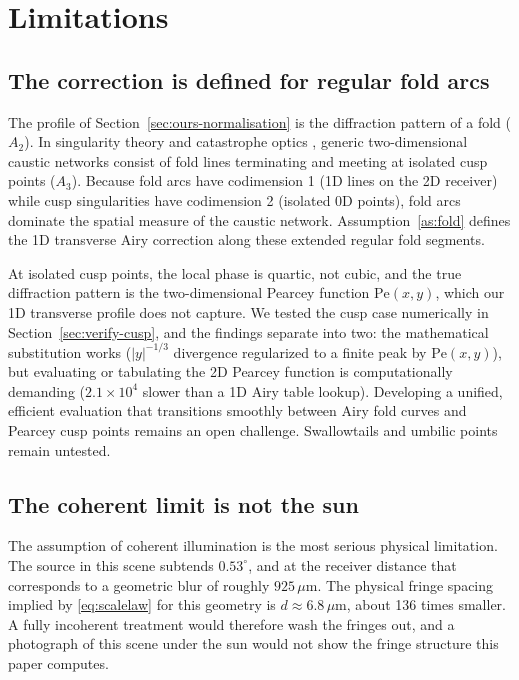 \section{Limitations}
\label{sec:limitations}

\subsection{The correction is defined for regular fold arcs}
\label{sec:limits-fold}

The profile of Section~\ref{sec:ours-normalisation} is the diffraction pattern
of a fold ($A_2$). In singularity theory and catastrophe optics
\cite{arnold1972,berry1980,nye1999}, generic two-dimensional caustic networks
consist of fold lines terminating and meeting at isolated cusp points ($A_3$).
Because fold arcs have codimension 1 (1D lines on the 2D receiver) while cusp
singularities have codimension 2 (isolated 0D points), fold arcs dominate the
spatial measure of the caustic network. Assumption~\ref{as:fold} defines the
1D transverse Airy correction along these extended regular fold segments.

At isolated cusp points, the local phase is quartic, not cubic, and the
true diffraction pattern is the two-dimensional Pearcey function $\mathrm{Pe}(x,y)$,
which our 1D transverse profile does not capture. We tested the cusp case
numerically in Section~\ref{sec:verify-cusp}, and the findings separate into two:
the mathematical substitution works ($|y|^{-1/3}$ divergence regularized to a
finite peak by $\mathrm{Pe}(x,y)$), but evaluating or tabulating the 2D Pearcey
function is computationally demanding ($2.1 \times 10^4$ slower than a 1D Airy
table lookup). Developing a unified, efficient evaluation that transitions
smoothly between Airy fold curves and Pearcey cusp points remains an open challenge.
Swallowtails and umbilic points remain untested.

\subsection{The coherent limit is not the sun}
\label{sec:limits-coherence}

The assumption of coherent illumination is the most serious physical limitation. The source in this scene subtends
$0.53^\circ$, and at the receiver distance that corresponds to a geometric
blur of roughly $925\,\mu\text{m}$. The physical fringe spacing implied by
\eqref{eq:scalelaw} for this geometry is $d \approx 6.8\,\mu\text{m}$, about
\num{136} times smaller. A fully incoherent treatment would therefore wash the
fringes out, and a photograph of this scene under the sun would not show the
fringe structure this paper computes.


